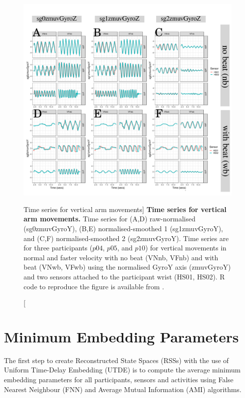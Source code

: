 \begin{figure}
\centering
\includegraphics[width=1.0\textwidth]{fig_5_02}
    	\caption
	[Time series for vertical arm movements]{
	{\bf Time series for vertical arm movements.}
		Time series for (A,D) raw-normalised (sg0zmuvGyroY), 
		(B,E) normalised-smoothed 1 (sg1zmuvGyroY), and
		(C,F) normalised-smoothed 2 (sg2zmuvGyroY).
		Time series are for three participants 
		($p04$, $p05$, and $p10$) 
		for vertical movements in normal and faster velocity with
		no beat	(VNnb, VFnb) and with beat (VNwb, VFwb) using the 
		normalised GyroY axis (zmuvGyroY) and two sensors 
		attached to the participant wrist (HS01, HS02).
	R code to reproduce the figure is available from \cite{xochicale2018}.
        }
    \label{fig:tsV-hii}
\end{figure}

\newpage
\section{Minimum Embedding Parameters} \label{mep-hii}
The first step to create Reconstructed State Spaces (RSSs) with the use of
Uniform Time-Delay Embedding (UTDE) is to compute the
average minimum embedding parameters for all participants, sensors and 
activities using False Nearest Neighbour (FNN) and 
Average Mutual Information (AMI) algorithms.

